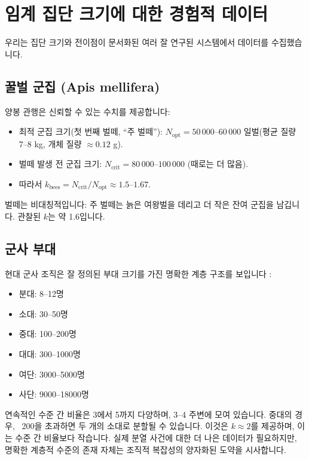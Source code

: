 \documentclass[12pt]{article}
\theoremstyle{remark}
\begin{document}
	\section{임계 집단 크기에 대한 경험적 데이터}
	\label{sec:data}
	
	우리는 집단 크기와 전이점이 문서화된 여러 잘 연구된 시스템에서 데이터를 수집했습니다.
	
	\subsection{꿀벌 군집 (Apis mellifera)}
	\label{subsec:bees}
	
	양봉 관행은 신뢰할 수 있는 수치를 제공합니다:
	\begin{itemize}
		\item 최적 군집 크기(첫 번째 벌떼, ``주 벌떼''): \(N_{\text{opt}} = 50\,000\)–\(60\,000\) 일벌(평균 질량 7–8 kg, 개체 질량 \(\approx 0.12\) g). \cite{Seeley2010, Winston1987}
		\item 벌떼 발생 전 군집 크기: \(N_{\text{crit}} = 80\,000\)–\(100\,000\) (때로는 더 많음). \cite{bees}
		\item 따라서 \(k_{\text{bees}} = N_{\text{crit}}/N_{\text{opt}} \approx 1.5\)–\(1.67\).
	\end{itemize}
	벌떼는 비대칭적입니다: 주 벌떼는 늙은 여왕벌을 데리고 더 작은 잔여 군집을 남깁니다. 관찰된 \(k\)는 약 1.6입니다.
	
	\subsection{군사 부대}
	\label{subsec:military}
	
	현대 군사 조직은 잘 정의된 부대 크기를 가진 명확한 계층 구조를 보입니다 \cite{FM3-90.5}:
	\begin{itemize}
		\item 분대: 8–12명
		\item 소대: 30–50명
		\item 중대: 100–200명
		\item 대대: 300–1000명
		\item 여단: 3000–5000명
		\item 사단: 9000–18000명
	\end{itemize}
	연속적인 수준 간 비율은 3에서 5까지 다양하며, 3–4 주변에 모여 있습니다. 중대의 경우, ~200을 초과하면 두 개의 소대로 분할될 수 있습니다. 이것은 \(k \approx 2\)를 제공하며, 이는 수준 간 비율보다 작습니다. 실제 분열 사건에 대한 더 나은 데이터가 필요하지만, 명확한 계층적 수준의 존재 자체는 조직적 복잡성의 양자화된 도약을 시사합니다.
	
\end{document}
